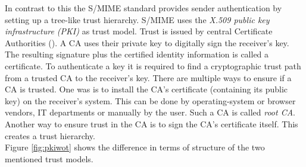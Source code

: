 In contrast to this the S/MIME standard \citep{RFC5751} provides sender authentication by setting up a tree-like trust hierarchy. S/MIME uses the \textit{X.509 public key infrastructure (PKI)} \citep{RFC5280} as trust model. Trust is issued by central Certificate Authorities (). A CA uses their private key to digitally sign the receiver's key. The resulting signature plus the certified identity information is called a certificate. To authenticate a key it is required to find a cryptographic trust path from a trusted CA to the receiver's key. There are multiple ways to ensure if a CA is trusted. One was is to install the CA's certificate (containing its public key) on the receiver's system. This can be done by operating-system or browser vendors, IT departments or manually by the user. Such a CA is called \textit{root CA}. Another way to ensure trust in the CA is to sign the CA's certificate itself. This creates a trust hierarchy. \\

Figure \ref{fig:pkiwot} shows the difference in terms of structure of the two mentioned trust models.

